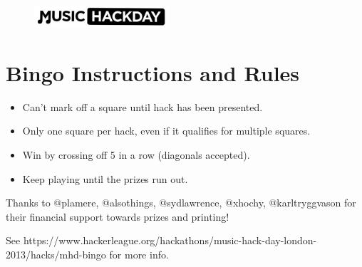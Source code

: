 \documentclass[a4]{article}
\def\NumOfColumns{5}%
\def\Sequence{1/A/1/15, 2/B/16/30, 3/C/31/45, 4/D/46/60, 5/E/61/71}%
\newcommand{\Size}{2.75cm}
\begin{document}



\begin{figure}[h]
    \centering
    \includegraphics[width=5cm]{./mhdlogo.jpg}
\end{figure}


\section*{Bingo Instructions and Rules}
\begin{itemize}
\item Can't mark off a square until hack has been presented.
\item Only one square per hack, even if it qualifies for multiple squares.
\item Win by crossing off 5 in a row (diagonals accepted).
\item Keep playing until the prizes run out.
\end{itemize}

\vspace{1cm}

\begin{center}
\end{center}

\vspace{1cm}
\noindent
Thanks to @plamere, @alsothings, @sydlawrence, @xhochy, @karltryggvason for their financial support towards prizes and printing!

\noindent
See https://www.hackerleague.org/hackathons/music-hack-day-london-2013/hacks/mhd-bingo for more info.
\end{document}
